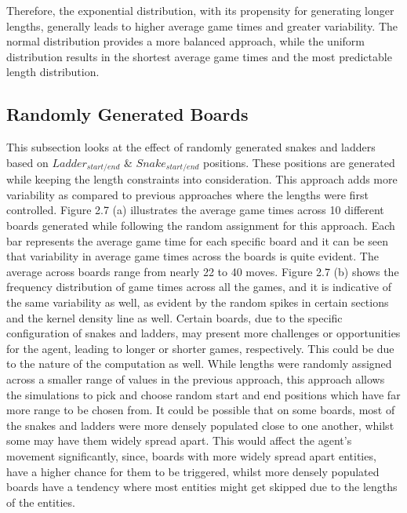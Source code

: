 \documentclass[12pt]{report}
\begin{document}
	Therefore, the exponential distribution, with its propensity for generating longer lengths, generally leads to higher average game times and greater variability. The normal distribution provides a more balanced approach, while the uniform distribution results in the shortest average game times and the most predictable length distribution. 
	
	\subsection{Randomly Generated Boards}
	This subsection looks at the effect of randomly generated snakes and ladders based on $Ladder_{start/end}$ \& $Snake_{start/end}$ positions. These positions are generated while keeping the length constraints into consideration. This approach adds more variability as compared to previous approaches where the lengths were first controlled. Figure 2.7 (a) illustrates the average game times across 10 different boards generated while following the random assignment for this approach. Each bar represents the average game time for each specific board and it can be seen that variability in average game times across the boards is quite evident. The average across boards range from nearly 22 to 40 moves. Figure 2.7 (b) shows the frequency distribution of game times across all the games, and it is indicative of the same variability as well, as evident by the random spikes in certain sections and the kernel density line as well. Certain boards, due to the specific configuration of snakes and ladders, may present more challenges or opportunities for the agent, leading to longer or shorter games, respectively. This could be due to the nature of the computation as well. While lengths were randomly assigned across a smaller range of values in the previous approach, this approach allows the simulations to pick and choose random start and end positions which have far more range to be chosen from. It could be possible that on some boards, most of the snakes and ladders were more densely populated close to one another, whilst some may have them widely spread apart. This would affect the agent's movement significantly, since, boards with more widely spread apart entities, have a higher chance for them to be triggered, whilst more densely populated boards have a tendency where most entities might get skipped due to the lengths of the entities. 
\end{document}
